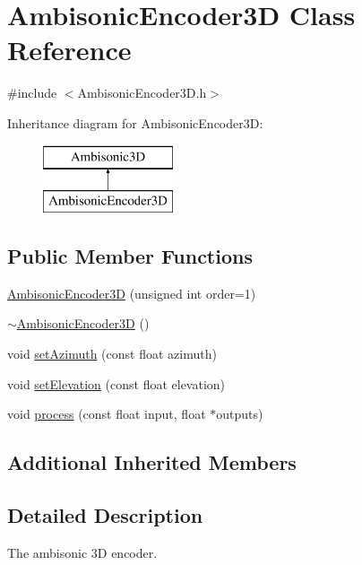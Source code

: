 \hypertarget{class_ambisonic_encoder3_d}{\section{Ambisonic\-Encoder3\-D Class Reference}
\label{class_ambisonic_encoder3_d}
}


{\ttfamily \#include $<$Ambisonic\-Encoder3\-D.\-h$>$}

Inheritance diagram for Ambisonic\-Encoder3\-D\-:\begin{figure}[H]
\begin{center}
\leavevmode
\includegraphics[height=2.000000cm]{class_ambisonic_encoder3_d}
\end{center}
\end{figure}
\subsection*{Public Member Functions}
\begin{DoxyCompactItemize}
\item 
\hyperlink{class_ambisonic_encoder3_d_a34d06da180ce0e7c557dcfb59f921460}{Ambisonic\-Encoder3\-D} (unsigned int order=1)
\item 
\hyperlink{class_ambisonic_encoder3_d_a79bf2dd4be497ed6f12b2509d519d35e}{$\sim$\-Ambisonic\-Encoder3\-D} ()
\item 
void \hyperlink{class_ambisonic_encoder3_d_a9283e59d438b5c50563f538f06c55a4f}{set\-Azimuth} (const float azimuth)
\item 
void \hyperlink{class_ambisonic_encoder3_d_a43e55c6883a55f0b1cee88a4229e8dc3}{set\-Elevation} (const float elevation)
\item 
void \hyperlink{class_ambisonic_encoder3_d_aaf4621c3b6361fc271b1726f09496010}{process} (const float input, float $\ast$outputs)
\end{DoxyCompactItemize}
\subsection*{Additional Inherited Members}


\subsection{Detailed Description}
The ambisonic 3\-D encoder.

